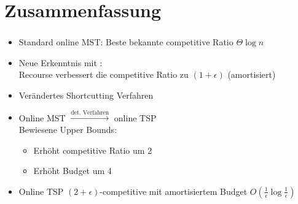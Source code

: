 \section{Zusammenfassung}

\begin{frame}
	\frametitle{\insertsection}
	\begin{itemize}
		\itemsep\setlength{1em}
		\item Standard online MST: Beste bekannte competitive Ratio $\Theta{\log n}$
		\item Neue Erkenntnis mit \cite{recourse2016}:\\Recourse verbessert die competitive Ratio zu \underline{$(1+\epsilon)$} (amortisiert)
		\item Verändertes Shortcutting Verfahren
		\item Online MST $\xrightarrow{\text{det. Verfahren}}$ online TSP\\
		\vspace{.3em}
		Bewiesene Upper Bounds:
		\vspace{.7em}
		\begin{itemize}
			\itemsep\setlength{.7em}
			\item Erhöht competitive Ratio um 2
			\item Erhöht Budget um 4
		\end{itemize}
		\item Online TSP $(2+\epsilon)$-competitive mit amortisiertem Budget $O(\frac{1}{\epsilon}\log\frac{1}{\epsilon})$
	\end{itemize}
\end{frame}